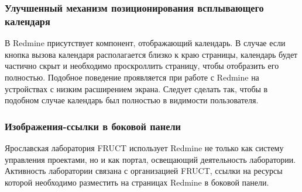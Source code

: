 \subsubsection{Улучшенный механизм позиционирования всплывающего календаря}
В Redmine присутствует компонент, отображающий календарь. В случае если кнопка
вызова календаря располагается близко к краю страницы, календарь
будет частично скрыт и необходимо проскроллить страницу, чтобы отобразить его
полностью. Подобное поведение проявляется при работе с Redmine на устройствах с
низким расширением экрана. Следует сделать так, чтобы в подобном случае
календарь был полностью в видимости пользователя.

\subsubsection{Изображения-ссылки в боковой панели}
Ярославская лаборатория FRUCT использует Redmine не только как систему
управления проектами, но и как портал, освещающий деятельность лаборатории.
Активность лаборатории связана с организацией FRUCT, ссылки на ресурсы которой
необходимо разместить на страницах Redmine в боковой панели.


